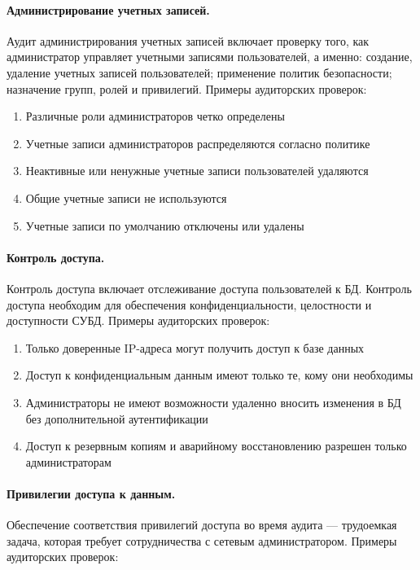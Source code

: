 \paragraph{Администрирование учетных записей.}

Аудит администрирования учетных записей включает проверку того, как администратор управляет учетными записями пользователей, а именно: создание, удаление учетных записей пользователей; применение политик безопасности; назначение групп, ролей и привилегий. Примеры аудиторских проверок:

\begin{enumerate}
	\item Различные роли администраторов четко определены
	\item Учетные записи администраторов распределяются согласно политике
	\item Неактивные или ненужные учетные записи пользователей удаляются
	\item Общие учетные записи не используются
	\item Учетные записи по умолчанию отключены или удалены
\end{enumerate}

\paragraph{Контроль доступа.}

Контроль доступа включает отслеживание доступа пользователей к БД. Контроль доступа необходим для обеспечения конфиденциальности, целостности и доступности СУБД. Примеры аудиторских проверок:

\begin{enumerate}
	\item Только доверенные IP-адреса могут получить доступ к базе данных
	\item Доступ к конфиденциальным данным имеют только те, кому они необходимы
	\item Администраторы не имеют возможности удаленно вносить изменения в БД без дополнительной аутентификации
	\item Доступ к резервным копиям и аварийному восстановлению разрешен только администраторам
\end{enumerate}

\paragraph{Привилегии доступа к данным.}

Обеспечение соответствия привилегий доступа во время аудита — трудоемкая задача, которая требует сотрудничества с сетевым администратором. Примеры аудиторских проверок:

